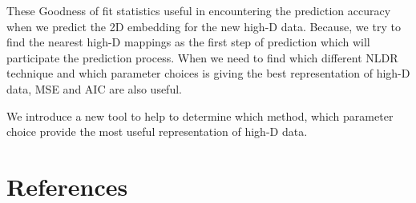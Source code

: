 \documentclass[
  12pt]{article}
\begin{document}
These Goodness of fit statistics useful in encountering the prediction
accuracy when we predict the 2D embedding for the new high-D data.
Because, we try to find the nearest high-D mappings as the first step of
prediction which will participate the prediction process. When we need
to find which different NLDR technique and which parameter choices is
giving the best representation of high-D data, MSE and AIC are also
useful.

We introduce a new tool to help to determine which method, which
parameter choice provide the most useful representation of high-D data.

\section*{References}\label{references}

\renewcommand{\bibsection}{}


\newpage{}
\end{document}
